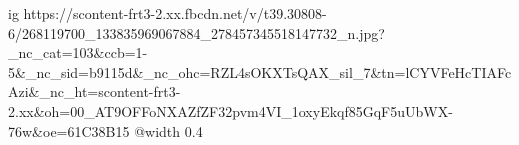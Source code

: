  
 
 
 
 

\ifcmt
  ig https://scontent-frt3-2.xx.fbcdn.net/v/t39.30808-6/268119700_133835969067884_278457345518147732_n.jpg?_nc_cat=103&ccb=1-5&_nc_sid=b9115d&_nc_ohc=RZL4sOKXTsQAX_sil_7&tn=lCYVFeHcTIAFcAzi&_nc_ht=scontent-frt3-2.xx&oh=00_AT9OFFoNXAZfZF32pvm4VI_1oxyEkqf85GqF5uUbWX-76w&oe=61C38B15
  @width 0.4
\fi
